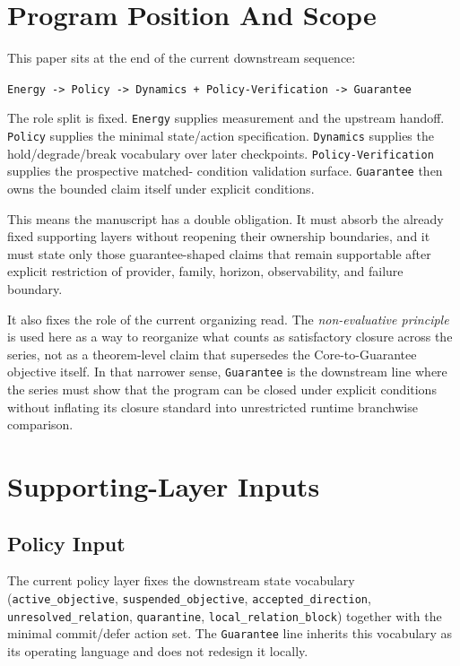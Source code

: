 \documentclass[11pt]{article}
\begin{document}
\section{Program Position And Scope}

This paper sits at the end of the current downstream sequence:

\begin{center}
\texttt{Energy -> Policy -> Dynamics + Policy-Verification -> Guarantee}
\end{center}

\noindent The role split is fixed. \texttt{Energy} supplies measurement and the
upstream handoff. \texttt{Policy} supplies the minimal state/action
specification. \texttt{Dynamics} supplies the hold/degrade/break vocabulary over
later checkpoints. \texttt{Policy-Verification} supplies the prospective matched-
condition validation surface. \texttt{Guarantee} then owns the bounded claim
itself under explicit conditions.

This means the manuscript has a double obligation. It must absorb the already
fixed supporting layers without reopening their ownership boundaries, and it must
state only those guarantee-shaped claims that remain supportable after explicit
restriction of provider, family, horizon, observability, and failure boundary.

It also fixes the role of the current organizing read. The
\textit{non-evaluative principle} is used here as a way to reorganize what
counts as satisfactory closure across the series, not as a theorem-level claim
that supersedes the Core-to-Guarantee objective itself. In that narrower sense,
\texttt{Guarantee} is the downstream line where the series must show that the
program can be closed under explicit conditions without inflating its closure
standard into unrestricted runtime branchwise comparison.

\section{Supporting-Layer Inputs}

\subsection{Policy Input}

The current policy layer fixes the downstream state vocabulary
(\texttt{active\_objective}, \texttt{suspended\_objective},
\texttt{accepted\_direction}, \texttt{unresolved\_relation},
\texttt{quarantine}, \texttt{local\_relation\_block}) together with the minimal
commit/defer action set. The \texttt{Guarantee} line inherits this vocabulary as
its operating language and does not redesign it locally.
\end{document}
